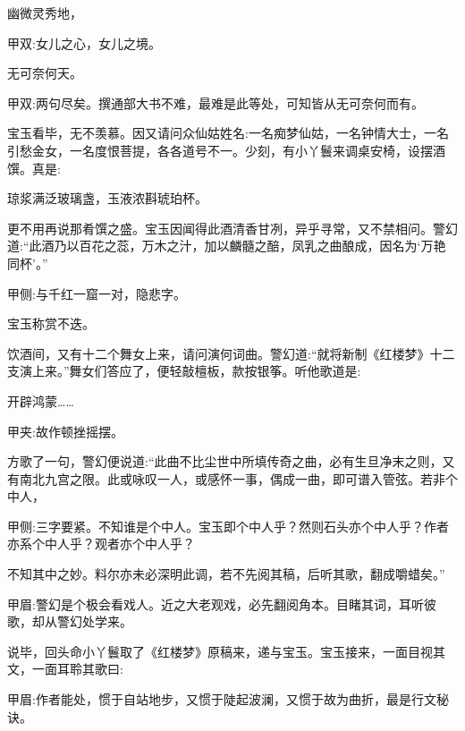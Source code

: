 \begin{poem}
    \begin{pl}幽微灵秀地，\end{pl}\begin{note}甲双:女儿之心，女儿之境。\end{note}

    \begin{pl}无可奈何天。\end{pl}\begin{note}甲双:两句尽矣。撰通部大书不难，最难是此等处，可知皆从无可奈何而有。\end{note}
\end{poem}


\begin{parag}
    宝玉看毕，无不羡慕。因又请问众仙姑姓名:一名痴梦仙姑，一名钟情大士，一名引愁金女，一名度恨菩提，各各道号不一。少刻，有小丫鬟来调桌安椅，设摆酒馔。真是:
\end{parag}


\begin{poem}
    \begin{pl} 琼浆满泛玻璃盏，玉液浓斟琥珀杯。\end{pl}
\end{poem}


\begin{parag}
    更不用再说那肴馔之盛。宝玉因闻得此酒清香甘冽，异乎寻常，又不禁相问。警幻道:“此酒乃以百花之蕊，万木之汁，加以麟髓之醅，凤乳之曲酿成，因名为‘万艳同杯’。”\begin{note}甲侧:与千红一窟一对，隐悲字。\end{note}宝玉称赏不迭。
\end{parag}


\begin{parag}
    饮酒间，又有十二个舞女上来，请问演何词曲。警幻道:“就将新制《红楼梦》十二支演上来。”舞女们答应了，便轻敲檀板，款按银筝。听他歌道是:
\end{parag}


\begin{qute2sp}

    开辟鸿蒙……\begin{note}甲夹:故作顿挫摇摆。\end{note}
\end{qute2sp}


\begin{parag}
    方歌了一句，警幻便说道:“此曲不比尘世中所填传奇之曲，必有生旦净末之则，又有南北九宫之限。此或咏叹一人，或感怀一事，偶成一曲，即可谱入管弦。若非个中人，\begin{note}甲侧:三字要紧。不知谁是个中人。宝玉即个中人乎？然则石头亦个中人乎？作者亦系个中人乎？观者亦个中人乎？\end{note}不知其中之妙。料尔亦未必深明此调，若不先阅其稿，后听其歌，翻成嚼蜡矣。”\begin{note}甲眉:警幻是个极会看戏人。近之大老观戏，必先翻阅角本。目睹其词，耳听彼歌，却从警幻处学来。\end{note}说毕，回头命小丫鬟取了《红楼梦》原稿来，递与宝玉。宝玉接来，一面目视其文，一面耳聆其歌曰:\begin{note}甲眉:作者能处，惯于自站地步，又惯于陡起波澜，又惯于故为曲折，最是行文秘诀。\end{note}
\end{parag}


